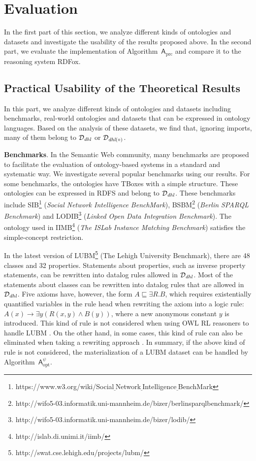 \section{Evaluation}
\label{sec:evaluation}

In the first part of this section, we analyze different kinds of ontologies and datasets
and investigate the usability of the results proposed above.
In the second part, we evaluate the implementation of Algorithm~$\mathsf{A}_{\text{prc}}$
and compare it to the reasoning system RDFox.

\subsection{Practical Usability of the Theoretical Results}

In this part, we analyze different kinds of ontologies and datasets
including benchmarks, real-world ontologies and
datasets that can be expressed in ontology languages.
Based on the analysis of these datasets,
we find that, ignoring imports, many of them
belong to $\mathcal{D}_{\textit{\text{dhl}}}$ or
$\mathcal{D}_{\textit{\text{dhl}}(\circ)}$.

\textbf{Benchmarks}. In the
Semantic Web community, many benchmarks are proposed to
facilitate the evaluation of ontology-based systems
in a standard and systematic way. We investigate several
popular benchmarks using our results. For some benchmarks, the ontologies have TBoxes with a simple
structure. These ontologies can be expressed in RDFS
and belong to $\mathcal{D}_{\textit{\text{dhl}}}$.
These benchmarks include SIB\footnote{https://www.w3.org/wiki/Social$\underline{~}$Network$\underline{~}$Intelligence$\underline{~}$BenchMark}
(\emph{Social Network Intelligence BenchMark}),
BSBM\footnote{http://wifo5-03.informatik.uni-mannheim.de/bizer/berlinsparqlbenchmark/}
(\emph{Berlin SPARQL Benchmark}) and
LODIB\footnote{http://wifo5-03.informatik.uni-mannheim.de/bizer/lodib/}
(\emph{Linked Open Data Integration Benchmark}).
The ontology used in IIMB\footnote{http://islab.di.unimi.it/iimb/}
(\emph{The ISLab Instance Matching Benchmark}) satisfies the simple-concept restriction.

In the latest version of LUBM\footnote{http://swat.cse.lehigh.edu/projects/lubm/}
(The Lehigh University Benchmark),
there are 48 classes and 32 properties.
Statements about properties, such as inverse property statements,
can be rewritten into datalog rules allowed in $\mathcal{D}_{\textit{\text{dhl}}}$.
Most of the statements about classes can be rewritten into datalog rules that
are allowed in $\mathcal{D}_{\textit{\text{dhl}}}$.
Five axioms have, however, the form $A\sqsubseteq\exists R.B$,
which requires existentially quantified variables in the rule head when rewriting
the axiom into a logic rule: $A(x)\rightarrow\exists y(R(x,y)\wedge B(y))$,
where a new anonymous constant $y$ is introduced.
This kind of rule is not considered when using OWL RL reasoners to handle LUBM \cite{UrbaniKMHB12,WeaverH09}.
On the other hand, in some cases, this kind of rule can also be
eliminated when taking a rewriting approach \cite{GrauHKKMMW13}.
In summary, if the above kind of rule is not considered,
the materialization of a LUBM dataset can be handled by Algorithm~$\mathsf{A}_{\text{opt}}^{\psi}$.

